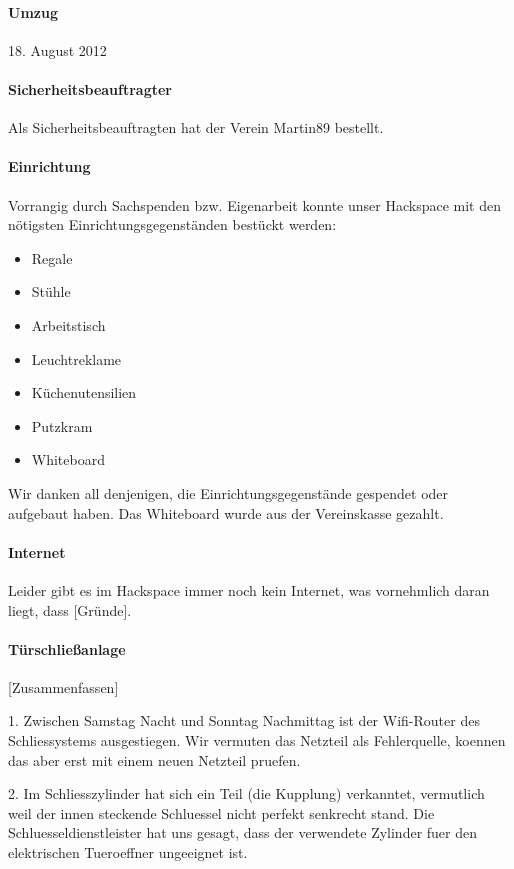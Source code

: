 \documentclass[10pt,DIV16]{scrartcl}
\begin{document}
\paragraph{Umzug}

18. August 2012

\paragraph{Sicherheitsbeauftragter}

Als Sicherheitsbeauftragten hat der Verein Martin89 bestellt.

\paragraph{Einrichtung}

Vorrangig durch Sachspenden bzw. Eigenarbeit konnte unser Hackspace mit den
nötigsten Einrichtungsgegenständen bestückt werden:
\begin{itemize}
	\item Regale
	\item Stühle
	\item Arbeitstisch
	\item Leuchtreklame
	\item Küchenutensilien
	\item Putzkram
	\item Whiteboard
\end{itemize}
Wir danken all denjenigen, die Einrichtungsgegenstände gespendet oder
aufgebaut haben.  Das Whiteboard wurde aus der Vereinskasse gezahlt.

\paragraph{Internet}

Leider gibt es im Hackspace immer noch kein Internet, was vornehmlich daran
liegt, dass [Gründe].

\paragraph{Türschließanlage}

[Zusammenfassen]

1. Zwischen Samstag Nacht und Sonntag Nachmittag ist der Wifi-Router des
Schliessystems ausgestiegen. Wir vermuten das Netzteil als Fehlerquelle,
koennen das aber erst mit einem neuen Netzteil pruefen.

2. Im Schliesszylinder hat sich ein Teil (die Kupplung) verkanntet,
vermutlich weil der innen steckende Schluessel nicht perfekt senkrecht
stand. Die Schluesseldienstleister hat uns gesagt, dass der verwendete
Zylinder fuer den elektrischen Tueroeffner ungeeignet ist.
\end{document}
